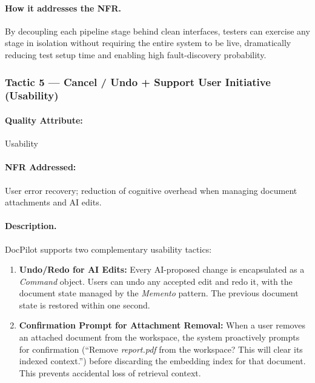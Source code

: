 \documentclass[12pt,a4paper]{article}
\begin{document}
\paragraph{How it addresses the NFR.}
By decoupling each pipeline stage behind clean interfaces, testers can exercise any stage in
isolation without requiring the entire system to be live, dramatically reducing test setup time
and enabling high fault-discovery probability.

\subsubsection{Tactic 5 --- Cancel / Undo + Support User Initiative (Usability)}

\paragraph{Quality Attribute:} Usability

\paragraph{NFR Addressed:} User error recovery; reduction of cognitive overhead when managing
document attachments and AI edits.

\paragraph{Description.}
DocPilot supports two complementary usability tactics:

\begin{enumerate}[nosep]
    \item \textbf{Undo/Redo for AI Edits:} Every AI-proposed change is encapsulated as a
    \textit{Command} object. Users can undo any accepted edit and redo it, with the document state
    managed by the \textit{Memento} pattern. The previous document state is restored within one
    second.

    \item \textbf{Confirmation Prompt for Attachment Removal:} When a user removes an attached
    document from the workspace, the system proactively prompts for confirmation (``Remove
    \textit{report.pdf} from the workspace? This will clear its indexed context.'') before
    discarding the embedding index for that document. This prevents accidental loss of retrieval
    context.
\end{enumerate}
\end{document}
